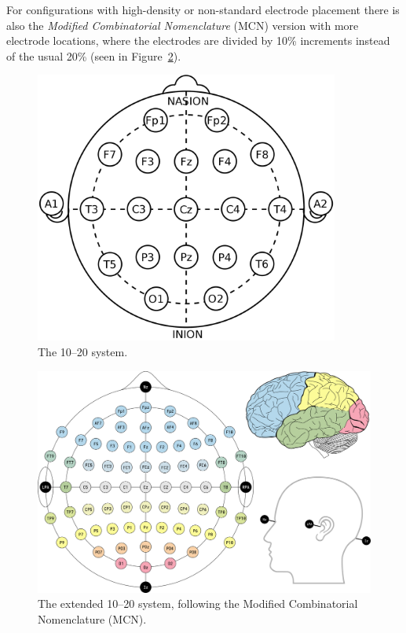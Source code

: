     For configurations with high-density or non-standard electrode placement there is also the \emph{Modified Combinatorial Nomenclature} (MCN) version with more electrode locations, where the electrodes are divided by 10\% increments instead of the usual 20\% (seen in Figure~\ref{fig:1020-extended}).

    \begin{figure}
        \begin{center}
            \includegraphics[width=10cm]{img/1020system.png}
        \end{center}
        \caption{The 10–20 system.}\label{fig:1020}
    \end{figure}

    \begin{figure}
        \begin{center}
            \includegraphics[width=14cm]{img/1020system-extended-with-extra-info.png}
        \end{center}
        \caption{The extended 10–20 system, following the Modified Combinatorial Nomenclature (MCN).}\label{fig:1020-extended}
    \end{figure}

